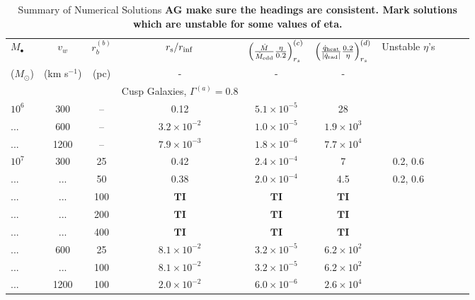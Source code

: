 \documentclass[usenatbib,fleqn]{mn2e}
\begin{document}
\begin{table}
\begin{threeparttable}
\begin{minipage}{18cm}
  \caption{Summary of Numerical Solutions {\bf AG make sure the
      headings are consistent. Mark solutions which are unstable for
      some values of eta.}}
\begin{tabular}{lccccccccc}
  \hline
  {$M_{\bullet}$} & {$v_{w}$} & {$r_b^{(b)}$} &   $r_{\rm s}/r_{\rm inf}$ &  {$\left(\frac{\dot{M}}{\dot{M}_{\rm edd}}\frac{\eta}{0.2}\right)_{r_{s}}^{(c)}$} &
  {$\left(\frac{\dot{q}_{\rm heat}}{|\dot{q}_{\rm
          rad}|}\frac{0.2}{\eta}\right)_{r_s}^{(d)}$} & Unstable
  $\eta$'s  \\
  ($M_{\odot}$) & (km s$^{-1}$) & (pc) &- & - & - &  & \\ 
  \hline
  & & & Cusp Galaxies, $\Gamma^{(a)} = 0.8$ & & & & & \\
  $    10^{ 6 }$ & 300 & -- & 0.12 & $ 5.1 \times 10^{ -5 }$ & 28 \\
... & 600 & -- & $ 3.2 \times 10^{ -2 }$ & $ 1.0 \times 10^{ -5 }$ & $ 1.9 \times 10^{ 3 }$ \\
... & 1200 & -- & $ 7.9 \times 10^{ -3 }$ & $ 1.8 \times 10^{ -6 }$ & $ 7.7 \times 10^{ 4 }$ \\
$    10^{ 7 }$ & 300 & 25 & 0.42 & $ 2.4 \times 10^{ -4 }$ & 7 & 0.2, 0.6\\ 
... & ... & 50 & 0.38 & $ 2.0 \times 10^{ -4 }$ & 4.5 & 0.2, 0.6\\
... & ... & 100 & $\mathbf{TI}$ & $\mathbf{TI}$ & $\mathbf{TI}$ \\
... & ... & 200 & $\mathbf{TI}$ & $\mathbf{TI}$ & $\mathbf{TI}$ \\
... & ... & 400 & $\mathbf{TI}$ & $\mathbf{TI}$ & $\mathbf{TI}$ \\
... & 600 & 25 & $ 8.1 \times 10^{ -2 }$ & $ 3.2 \times 10^{ -5 }$ & $ 6.2 \times 10^{ 2 }$ \\
... & ... & 100 & $ 8.1 \times 10^{ -2 }$ & $ 3.2 \times 10^{ -5 }$ & $ 6.2 \times 10^{ 2 }$ \\
... & 1200 & 100 & $ 2.0 \times 10^{ -2 }$ & $ 6.0 \times 10^{ -6 }$ & $ 2.6 \times 10^{ 4 }$ \\

\end{tabular}
\end{minipage}
\end{threeparttable}
\end{table}
\end{document}
